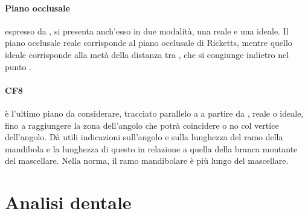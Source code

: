 \paragraph{Piano occlusale} espresso da , si presenta anch'esso in due modalità, una reale e una ideale. Il piano occlusale reale corrisponde al piano occlusale di Ricketts, mentre quello ideale corrisponde alla metà della distanza tra , che si congiunge indietro nel punto .\\

\paragraph{CF8} è l'ultimo piano da considerare, tracciato parallelo a  a partire da , reale o ideale, fino a raggiungere la zona dell'angolo che potrà coincidere o no col vertice dell'angolo. Dà utili indicazioni sull'angolo e sulla lunghezza del ramo della mandibola e la lunghezza di questo in relazione a quella della branca montante del mascellare. Nella norma, il ramo mandibolare è più lungo del mascellare.


\section{Analisi dentale}
